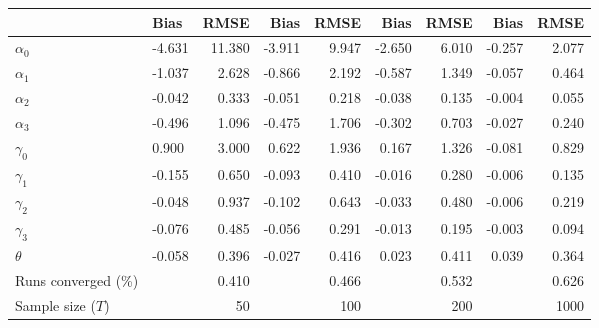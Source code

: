 
\begin{tabular}[t]{llrrrrrrr}
\toprule
  & Bias & RMSE & Bias & RMSE & Bias & RMSE & Bias & RMSE\\
\midrule
$\alpha_{0}$ & -4.631 & 11.380 & -3.911 & 9.947 & -2.650 & 6.010 & -0.257 & 2.077\\
$\alpha_{1}$ & -1.037 & 2.628 & -0.866 & 2.192 & -0.587 & 1.349 & -0.057 & 0.464\\
$\alpha_{2}$ & -0.042 & 0.333 & -0.051 & 0.218 & -0.038 & 0.135 & -0.004 & 0.055\\
$\alpha_{3}$ & -0.496 & 1.096 & -0.475 & 1.706 & -0.302 & 0.703 & -0.027 & 0.240\\
$\gamma_{0}$ & 0.900 & 3.000 & 0.622 & 1.936 & 0.167 & 1.326 & -0.081 & 0.829\\
$\gamma_{1}$ & -0.155 & 0.650 & -0.093 & 0.410 & -0.016 & 0.280 & -0.006 & 0.135\\
$\gamma_{2}$ & -0.048 & 0.937 & -0.102 & 0.643 & -0.033 & 0.480 & -0.006 & 0.219\\
$\gamma_{3}$ & -0.076 & 0.485 & -0.056 & 0.291 & -0.013 & 0.195 & -0.003 & 0.094\\
$\theta$ & -0.058 & 0.396 & -0.027 & 0.416 & 0.023 & 0.411 & 0.039 & 0.364\\
Runs converged (\%) &  & 0.410 &  & 0.466 &  & 0.532 &  & 0.626\\
Sample size ($T$) &  & 50 &  & 100 &  & 200 &  & 1000\\
\bottomrule
\end{tabular}
